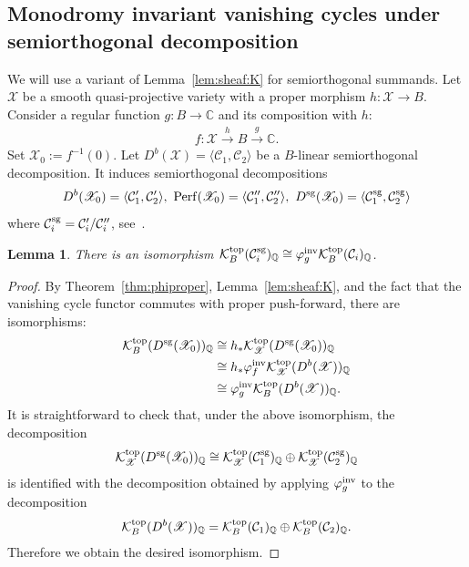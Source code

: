 \documentclass [11pt,oneside,a4paper,mathscr]{amsart}
\newtheorem{lemma}[thm]{Lemma}
\theoremstyle{definition}
\newcommand{\X}{\mathscr{X}}
\begin{document}
\subsection{Monodromy invariant vanishing cycles under semiorthogonal decomposition}
We will use a variant of Lemma~\ref{lem:sheaf:K} for semiorthogonal 
summands. 
Let $\X$ be a smooth quasi-projective variety 
with a proper morphism $h \colon \X \to B$. 
Consider a regular function $g \colon B \to \mathbb{C}$ and 
its composition with $h$:
\begin{align*}
    f \colon \X \stackrel{h}{\to} B \stackrel{g}{\to} \mathbb{C}. 
\end{align*}
Set $\X_0:=f^{-1}(0)$.
Let $D^b(\X)=\langle \mathcal{C}_1, \mathcal{C}_2 \rangle$ be a 
$B$-linear semiorthogonal decomposition. 
It induces semiorthogonal decompositions 
\begin{align*}
D^b(\X_0)=\langle \mathcal{C}_1', \mathcal{C}_2'\rangle, \ 
\mathrm{Perf}(\X_0)=\langle \mathcal{C}_1'', \mathcal{C}_2'' \rangle, \ 
D^{\rm{sg}}(\X_0)=\langle \mathcal{C}_1^{\rm{sg}}, \mathcal{C}_2^{\rm{sg}} \rangle
\end{align*}
where $\mathcal{C}_i^{\rm{sg}}=\mathcal{C}_i'/\mathcal{C}_i''$, 
see~\cite[Proposition~2.5]{PTzero}. 


\begin{lemma}\label{lem:sod:induce}
There is an isomorphism $\mathcal{K}_B^{\rm{top}}(\mathcal{C}_i^{\rm{sg}})_{\mathbb{Q}} \cong 
    \varphi_g^{\rm{inv}}\mathcal{K}_B^{\rm{top}}(\mathcal{C}_i)_{\mathbb{Q}}$. 
\end{lemma}
\begin{proof}
By Theorem~\ref{thm:phiproper}, Lemma~\ref{lem:sheaf:K}, and the fact that the vanishing cycle functor 
commutes with proper push-forward, there are isomorphisms: 
\begin{align*}
    \mathcal{K}_B^{\rm{top}}(D^{\rm{sg}}(\X_0))_{\mathbb{Q}} &\cong h_{\ast}\mathcal{K}_{\X}^{\rm{top}}(D^{\rm{sg}}(\X_0))_{\mathbb{Q}} \\
    &\cong h_{\ast}\varphi_f^{\rm{inv}}\mathcal{K}_{\X}^{\rm{top}}(D^b(\X))_{\mathbb{Q}} \\
    &\cong \varphi_g^{\rm{inv}}\mathcal{K}_B^{\rm{top}}(D^b(\X))_{\mathbb{Q}}. 
\end{align*}
It is straightforward to check that, under the above isomorphism,
    the decomposition 
    \begin{align*}
        \mathcal{K}_{\X}^{\rm{top}}(D^{\rm{sg}}(\X_0))_{\mathbb{Q}} \cong 
        \mathcal{K}_{\X}^{\rm{top}}(\mathcal{C}_1^{\rm{sg}})_{\mathbb{Q}} \oplus \mathcal{K}_{\X}^{\rm{top}}(\mathcal{C}_2^{\rm{sg}})_{\mathbb{Q}}
    \end{align*}
    is identified with the decomposition obtained by applying 
    $\varphi_g^{\rm{inv}}$ to the decomposition 
    \begin{align*}
        \mathcal{K}_B^{\rm{top}}(D^b(\X))_{\mathbb{Q}}=\mathcal{K}_B^{\rm{top}}(\mathcal{C}_1)_{\mathbb{Q}} \oplus \mathcal{K}_B^{\rm{top}}(\mathcal{C}_2)_{\mathbb{Q}}. 
    \end{align*}
    Therefore we obtain the desired isomorphism.     
\end{proof}
\end{document}
